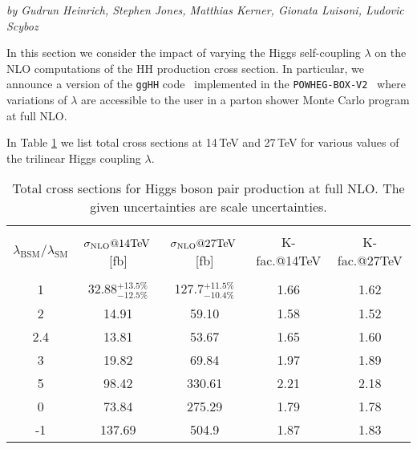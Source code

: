 \label{subsec:varylambda}

\begin{center}
\textit{by  Gudrun Heinrich, Stephen Jones, Matthias Kerner, Gionata Luisoni, Ludovic Scyboz}
\end{center}

In this section we consider the impact of varying the Higgs self-coupling $\lambda$ on the NLO computations of the HH production cross section.
In particular, we announce a version of the {\tt ggHH} code~\cite{Borowka:2016ypz,Heinrich:2017kxx,Borowka:2016ehy} implemented in the {\tt POWHEG-BOX-V2}~\cite{Alioli:2010xd} where variations of  $\lambda$ are accessible to the user in a parton shower Monte Carlo program at full NLO.


In Table \ref{tab:sigmatot} we list total cross sections at 14\,TeV and 27\,TeV for various values of the trilinear Higgs coupling $\lambda$. 
\begin{table}[htb]
\begin{center}
\begin{tabular}{| c | c | c |c|c|}
\hline
&&&&\\
$\lambda_{\mathrm{BSM}}/\lambda_{\mathrm{SM}}$ & $\sigma_{\rm{NLO}}@14 \mathrm{TeV}$\,[fb] & $\sigma_{\rm{NLO}}@27 \mathrm{TeV}$\,[fb] &K-fac.@14TeV&K-fac.@27TeV\\
&&&&\\
\hline
1& 32.88$^{+13.5\%}_{-12.5\%}$&127.7$^{+11.5\%}_{-10.4\%}$ &1.66&1.62\\
\hline
2 & 14.91 &  59.10 & 1.58 & 1.52\\
\hline
2.4 & 13.81& 53.67 & 1.65 & 1.60\\
\hline
3& 19.82 & 69.84 & 1.97 & 1.89\\
\hline 
5 & 98.42& 330.61 & 2.21 & 2.18\\
\hline 
0 & 73.84& 275.29& 1.79 & 1.78 \\
\hline 
-1 & 137.69& 504.9 & 1.87 & 1.83\\
\hline
\end{tabular}
\end{center}
\caption{Total cross sections for Higgs boson pair production at full NLO. The given uncertainties are scale uncertainties. 
\label{tab:sigmatot}}
\end{table}

